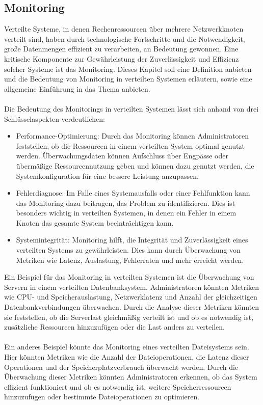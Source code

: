 \subsection{Monitoring}
Verteilte Systeme, in denen Rechenressourcen über mehrere Netzwerkknoten verteilt sind, haben durch technologische Fortschritte und die Notwendigkeit, große Datenmengen effizient zu verarbeiten, an Bedeutung gewonnen. Eine kritische Komponente zur Gewährleistung der Zuverlässigkeit und Effizienz solcher Systeme ist das Monitoring. Dieses Kapitel soll eine Definition anbieten und die Bedeutung von Monitoring in verteilten Systemen erläutern, sowie eine allgemeine Einführung in das Thema anbieten. 
\\\\
Die Bedeutung des Monitorings in verteilten Systemen lässt sich anhand von drei Schlüsselaspekten verdeutlichen: 
\begin{itemize}
\item Performance-Optimierung: Durch das Monitoring können Administratoren feststellen, ob die Ressourcen in einem verteilten System optimal genutzt werden. Überwachungsdaten können Aufschluss über Engpässe oder übermäßige Ressourcennutzung geben und können dazu genutzt werden, die Systemkonfiguration für eine bessere Leistung anzupassen.
\item Fehlerdiagnose: Im Falle eines Systemausfalls oder einer Fehlfunktion kann das Monitoring dazu beitragen, das Problem zu identifizieren. Dies ist besonders wichtig in verteilten Systemen, in denen ein Fehler in einem Knoten das gesamte System beeinträchtigen kann.
\item Systemintegrität: Monitoring hilft, die Integrität und Zuverlässigkeit eines verteilten Systems zu gewährleisten. Dies kann durch Überwachung von Metriken wie Latenz, Auslastung, Fehlerraten und mehr erreicht werden.
\end{itemize}
Ein Beispiel für das Monitoring in verteilten Systemen ist die Überwachung von Servern in einem verteilten Datenbanksystem. Administratoren könnten Metriken wie CPU- und Speicherauslastung, Netzwerklatenz und Anzahl der gleichzeitigen Datenbankverbindungen überwachen. Durch die Analyse dieser Metriken könnten sie feststellen, ob die Serverlast gleichmäßig verteilt ist und ob es notwendig ist, zusätzliche Ressourcen hinzuzufügen oder die Last anders zu verteilen.
\\\\
Ein anderes Beispiel könnte das Monitoring eines verteilten Dateisystems sein. Hier könnten Metriken wie die Anzahl der Dateioperationen, die Latenz dieser Operationen und der Speicherplatzverbrauch überwacht werden. Durch die Überwachung dieser Metriken könnten Administratoren erkennen, ob das System effizient funktioniert und ob es notwendig ist, weitere Speicherressourcen hinzuzufügen oder bestimmte Dateioperationen zu optimieren.
